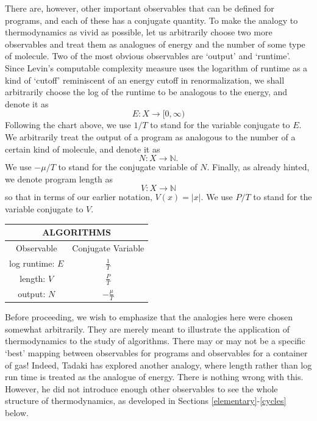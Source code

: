 \documentclass[12pt,twoside,openright]{report}
\newcommand{\maps}{\colon}
\newcommand{\N}{\mathbb{N}}
\begin{document}
There are, however, other important observables that can be defined for programs, and each of these has a conjugate quantity.  To make the analogy to thermodynamics as vivid as possible, let us arbitrarily choose two more observables and treat them as analogues of energy and the number of some type of molecule.  Two of the most obvious observables are `output' and `runtime'.  Since Levin's computable complexity measure \cite{Levin1973} uses the logarithm of runtime as a kind of `cutoff' reminiscent of an energy cutoff in renormalization, we shall arbitrarily choose the log of the runtime to be analogous to the energy, and denote it as
\[    E \maps X \to [0,\infty) \]
Following the chart above, we use $1/T$ to stand for the variable conjugate to $E$.   We arbitrarily treat the output of a program as analogous to the number of a certain kind of molecule, and denote it as
\[    N \maps X \to \N . \]
We use $-\mu/T$ to stand for the conjugate variable of $N$. Finally, as already hinted, we denote program length as
\[    V \maps X \to \N   \]
so that in terms of our earlier notation, $V(x) = |x|$.  We use
$P/T$ to stand for the variable conjugate to $V$.

\begin{center}
\renewcommand{\arraystretch}{2.3}
\begin{tabular}{c|c}  
\multicolumn{2}{c}{\bf{ALGORITHMS}} \\
\hline Observable  & Conjugate Variable\\ 
\hline log runtime: $E$  & $\displaystyle{\frac{1}{T}}$ \\
length:      $V$  & $\displaystyle{\frac{P}{T}}$  \\
output:      $N$  & $\displaystyle{-\frac{\mu}{T}}$   \\
\end{tabular}
\end{center}
\renewcommand{\arraystretch}{1}

Before proceeding, we wish to emphasize that the analogies here were chosen somewhat arbitrarily.  They are merely meant to illustrate the application of thermodynamics to the study of algorithms.  There may or may not be a specific `best' mapping between observables for programs and observables for a container of gas!  Indeed, Tadaki \cite{Tadaki2008} has explored another analogy, where length rather than log run time is treated as the analogue of energy.  There is nothing wrong with this.  However, he did not introduce enough other observables to see the whole structure of thermodynamics, as developed in Sections \ref{elementary}-\ref{cycles}
below.  
\end{document}

